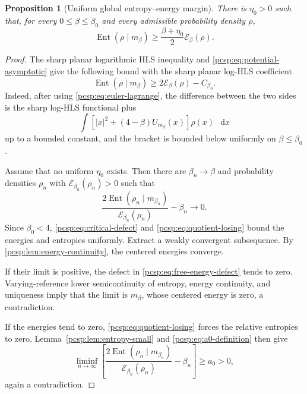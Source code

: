 \documentclass[11pt,reqno]{amsart}
\numberwithin{equation}{section}
\theoremstyle{plain}
\newtheorem{prop}[prop]{Proposition}
\theoremstyle{definition}
\newcommand{\dd}{\mathop{}\!\mathrm d}
\newcommand{\be}{\beta}
\newcommand{\Ent}{\operatorname{Ent}}
\newcommand{\Ecal}{\mathcal E}
\begin{document}
\begin{prop}[Uniform global entropy--energy margin]\label{pcsp:prop:global-gap}
There is $\eta_0>0$ such that, for every $0\leq\be\leq\be_0$ and every admissible probability density $\rho$,
\begin{equation}\label{pcsp:eq:global-gap}
 \Ent(\rho\mid m_\be)
 \geq\frac{\be+\eta_0}{2}\Ecal_\be(\rho).
\end{equation}
\end{prop}

\begin{proof}
The sharp planar logarithmic HLS inequality and \eqref{pcsp:eq:potential-asymptotic} give the following bound with the sharp planar log-HLS coefficient
\begin{equation}\label{pcsp:eq:critical-defect}
 \Ent(\rho\mid m_\be)\geq2\Ecal_\be(\rho)-C_{\be_0}.
\end{equation}
Indeed, after using \eqref{pcsp:eq:euler-lagrange}, the difference between the two sides is the sharp log-HLS functional plus
\begin{equation}\label{pcsp:eq:effective-potential}
 \int\left[|x|^2+(4-\be)U_{m_\be}(x)\right]\rho(x)\,\dd x
\end{equation}
up to a bounded constant, and the bracket is bounded below uniformly on $\be\leq\be_0$.

Assume that no uniform $\eta_0$ exists.  Then there are $\be_n\to\be$ and probability densities $\rho_n$ with $\Ecal_{\be_n}(\rho_n)>0$ such that
\begin{equation}\label{pcsp:eq:quotient-losing}
 \frac{2\Ent(\rho_n\mid m_{\be_n})}
 {\Ecal_{\be_n}(\rho_n)}-\be_n\longrightarrow0.
\end{equation}
Since $\be_0<4$, \eqref{pcsp:eq:critical-defect} and \eqref{pcsp:eq:quotient-losing} bound the energies and entropies uniformly.  Extract a weakly convergent subsequence.  By \cref{pcsp:lem:energy-continuity}, the centered energies converge.

If their limit is positive, the defect in \eqref{pcsp:eq:free-energy-defect} tends to zero.  Varying-reference lower semicontinuity of entropy, energy continuity, and uniqueness imply that the limit is $m_\be$, whose centered energy is zero, a contradiction.

If the energies tend to zero, \eqref{pcsp:eq:quotient-losing} forces the relative entropies to zero.  Lemma~\ref{pcsp:lem:entropy-small} and \eqref{pcsp:eq:a0-definition} then give
\begin{equation}\label{pcsp:eq:local-contradiction}
 \liminf_{n\to\infty}
 \left[
 \frac{2\Ent(\rho_n\mid m_{\be_n})}
 {\Ecal_{\be_n}(\rho_n)}-\be_n
 \right]\geq a_0>0,
\end{equation}
again a contradiction.
\end{proof}
\end{document}

